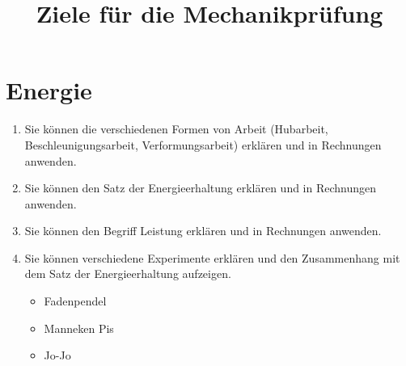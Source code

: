 \documentclass[12pt,a4paper,twoside]{article}
\title{Ziele für die Mechanikprüfung}
\date{}
\begin{document}
\maketitle

\section*{Energie}

\begin{enumerate}
	\item Sie können die verschiedenen Formen von Arbeit (Hubarbeit, Beschleunigungsarbeit, Verformungsarbeit)
		erklären und in Rechnungen anwenden.
	\item Sie können den Satz der Energieerhaltung erklären und in Rechnungen anwenden.
	\item Sie können den Begriff Leistung erklären und in Rechnungen anwenden.
	\item Sie können verschiedene Experimente erklären und den Zusammenhang mit dem Satz der Energieerhaltung aufzeigen.
		\begin{itemize}
			\item Fadenpendel
			\item Manneken Pis
			\item Jo-Jo
		\end{itemize}

\end{enumerate}
\end{document}
